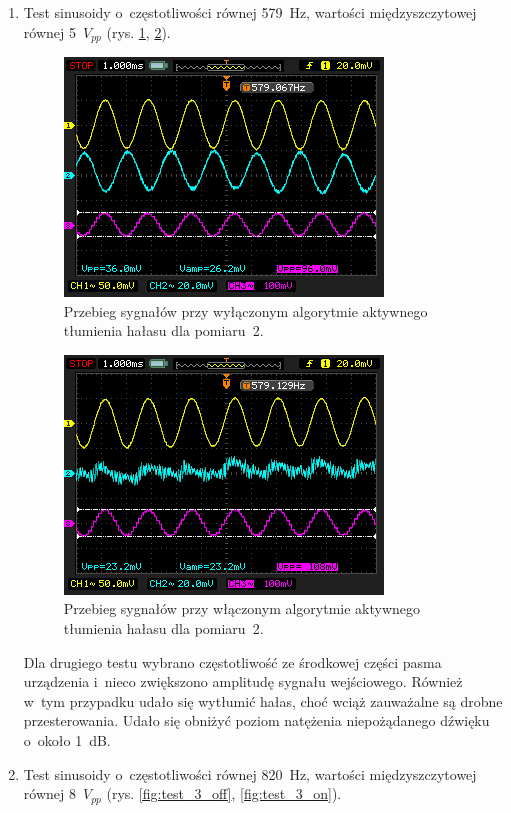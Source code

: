 \begin{enumerate}
	\item Test sinusoidy o~częstotliwości równej \SI{579}{\Hz}, wartości międzyszczytowej równej 5~$V_{pp}$ (rys. \ref{fig:test_2_off}, \ref{fig:test_2_on}).\\
	\begin{figure}[h!]
		\centering
		\includegraphics[scale=0.7]{../Assets/Results/2_579_5_off.png}
		\caption{Przebieg sygnałów przy wyłączonym algorytmie aktywnego tłumienia hałasu dla pomiaru~2.}
		\label{fig:test_2_off}
	\end{figure}
	\begin{figure}[h!]
		\centering
		\includegraphics[scale=0.7]{../Assets/Results/2_579_5_on.png}
		\caption{Przebieg sygnałów przy włączonym algorytmie aktywnego tłumienia hałasu dla pomiaru~2.}
		\label{fig:test_2_on}
	\end{figure}
	Dla drugiego testu wybrano częstotliwość ze środkowej części pasma urządzenia i~nieco zwiększono amplitudę sygnału wejściowego. Również w~tym przypadku udało się wytłumić hałas, choć wciąż zauważalne są drobne przesterowania. Udało się obniżyć poziom natężenia niepożądanego dźwięku o~około \SI{1}{\dB}.
	\item Test sinusoidy o~częstotliwości równej \SI{820}{\Hz}, wartości międzyszczytowej równej 8~$V_{pp}$ (rys. \ref{fig:test_3_off}, \ref{fig:test_3_on}).\\

\end{enumerate}
